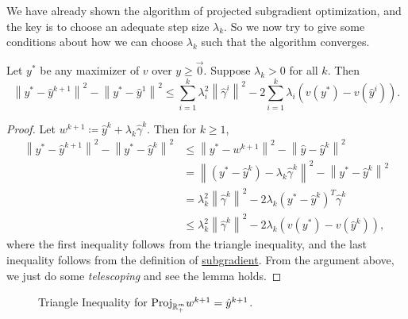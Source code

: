 \begin{prev}
	We have already shown the algorithm of projected subgradient optimization, and the key is to choose an adequate
	step size \(\lambda_{k}\). So we now try to give some conditions about how we can choose \(\lambda_{k}\) such
	that the algorithm converges.
\end{prev}

\begin{lemma}
	Let \(y^{*}\) be any maximizer of \(v\) over \(y\geq \vec{0}\). Suppose \(\lambda_{k}>0\) for all \(k\). Then
	\[
		\left\lVert y^{*} - \hat{y}^{k+1}\right\rVert^2 - \left\lVert y^{*} - \hat{y}^1\right\rVert^2 \leq \sum\limits_{i=1}^{k} \lambda_{i}^{2}\left\lVert \hat{\gamma}^i\right\rVert^2 - 2 \sum\limits_{i=1}^{k} \lambda_{i}\left(v(y^{*}) - v(\hat{y}^i)\right).
	\]
\end{lemma}
\begin{proof}
	Let \(w^{k+1} \coloneqq \hat{y}^k + \lambda_{k}\hat{\gamma}^k\). Then for \(k\geq 1\),
	\[
		\begin{split}
			\left\lVert y^{*} - \hat{y}^{k+1}\right\rVert^2 - \left\lVert y^{*} - \hat{y}^k\right\rVert^2 &\leq \left\lVert y^{*} - w^{k+1}\right\rVert^2 - \left\lVert \hat{y} - \hat{y}^k\right\rVert^2\\
			&= \left\lVert (y^{*} - \hat{y}^k) - \lambda_{k}\hat{\gamma}^k\right\rVert^2 - \left\lVert y^{*} - \hat{y}^k\right\rVert^2\\
			&= \lambda_{k}^{2}\left\lVert \hat{\gamma}^k\right\rVert^2 - 2\lambda_{k}(y^{*} - \hat{y}^k)^{T}\hat{\gamma}^k\\
			&\leq \lambda_{k}^{2}\left\lVert \hat{\gamma}^k\right\rVert^2 - 2\lambda_{k}(v(y^{*}) - v(\hat{y}^k)),
		\end{split}
	\]
	where the first inequality follows from the triangle inequality, and the last inequality follows from the definition of
	\hyperref[def:subgradient]{subgradient}. From the argument above, we just do some \emph{telescoping} and see the lemma holds.
\end{proof}
\begin{figure}[H]
	\centering
	\caption{Triangle Inequality for \(\mathrm{Proj}_{\mathbb{\MakeUppercase{R}}^m_+}w^{k+1} = \hat{y}^{k+1}\).}
	\label{fig:maximizer-lemma-triangle-inequality}
\end{figure}

